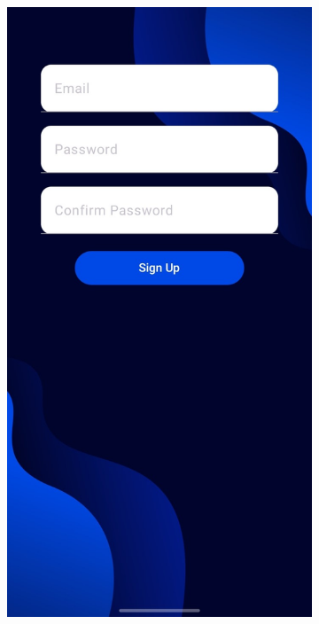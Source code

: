 \begin{figure}[H]
  \centering
  \begin{subfigure}{0.2\textwidth}
    \includegraphics[width=\linewidth]{images/3-aplicatia-android/sign_up_screen.jpeg}
    \caption{}
    \label{fig:sign_up_screen}

\end{subfigure}
\end{figure}
